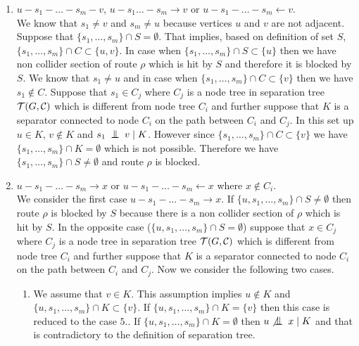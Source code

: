 \begin{prf}
\begin{enumerate}
		\item $u - s_1 - \dots - s_m - v$, $u - s_1 \dots - s_m \rightarrow v$ or $u - s_1 - \dots - s_m \leftarrow v$. \\ 
			We know that $s_1 \neq v$ and $s_m \neq u$ because vertices $u$ and $v$ are not adjacent. Suppose that 
			$\{ s_1, \dots, s_m \} \cap S = \emptyset$. That implies, based on definition of set $S$, $\{ s_1, \dots, s_m \} \cap C \subset \{u, v\}$.
			In case when $\{ s_1, \dots, s_m \} \cap S \subset \{ u \}$ then we have non collider section of route $\rho$ which is hit by $S$ and therefore
			it is blocked by $S$. We know that $s_1 \neq u$ and in case when $\{ s_1, \dots, s_m \} \cap C \subset \{ v \}$ then we have $s_1 \not\in C$.
			Suppose that $s_1 \in C_j$ where $C_j$ is a node tree in separation tree $\mathcal{T}(G, \mathcal{C})$ which is different from node tree $C_i$ and further
			suppose that $K$ is a separator connected to node $C_i$ on the path between $C_i$ and $C_j$. In this set up $u \in K$, $v \not\in K$ and 
			$s_1 \bigCI v \mid K$.
			However since $\{ s_1, \dots, s_m \} \cap C \subset \{ v \}$ we have $\{ s_1, \dots, s_m \} \cap K = \emptyset$ which is not possible. 
			Therefore we have $\{ s_1, \dots, s_m \} \cap S \neq \emptyset$ and route $\rho$ is blocked.

		\item $u - s_1 - \dots - s_m \rightarrow x$ or $u - s_1 - \dots - s_m \leftarrow x$ where $x \not\in C_i$. \\
			We consider the first case $u - s_1 - \dots - s_m \rightarrow x$. If $\{ u, s_1, \dots, s_m \} \cap S \neq \emptyset$ then 
			route $\rho$ is blocked by $S$ because there is a non collider section of $\rho$ which is hit by $S$. In the opposite case 
			($ \{ u, s_1, \dots, s_m \} \cap S = \emptyset$) suppose that $x \in C_j$ where $C_j$ is a node tree in separation tree $\mathcal{T}(G, \mathcal{C})$ 
			which is different from node tree $C_i$ and further suppose that $K$ is a separator connected to node $C_i$ on the path between $C_i$ and $C_j$.
			Now we consider the following two cases.

			\begin{enumerate}
				\item We assume that $v \in K$. This assumption implies $u \not\in K$ and $\{ u, s_1, \dots, s_m \} \cap K \subset \{ v \}$.
					If $\{ u, s_1, \dots, s_m \} \cap K = \{ v \}$ then this case is reduced to the case $5.$. 
					If $\{ u, s_1, \dots, s_m \} \cap K = \emptyset$ then $u \not \bigCI x \mid K$ and that is contradictory to the
					definition of separation tree.


\end{enumerate}
\end{enumerate}
\end{prf}
